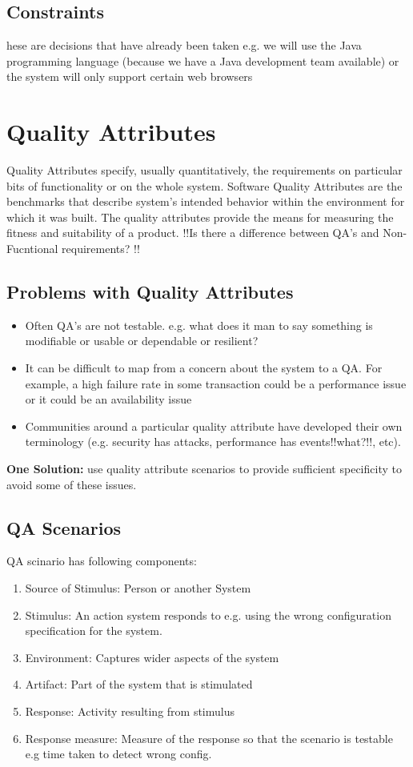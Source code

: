 \documentclass[a4paper]{report}
\begin{document}
\subsection{Constraints}
hese are decisions that have already been taken e.g. we will use the Java programming language (because we have a Java development team available) or the system will only support certain web browsers
\section{Quality Attributes}
Quality Attributes specify, usually quantitatively, the requirements on particular bits of functionality or on the whole system. 
Software Quality Attributes are the benchmarks that describe system’s intended behavior within the environment for which it was built. The quality attributes provide the means for measuring the fitness and suitability of a product.
!!Is there a difference between QA's and Non-Fucntional requirements? !!

\subsection{Problems with Quality Attributes}
\begin{itemize}
\item Often QA's are not testable. e.g. what does it man to say something is modifiable or usable or dependable or resilient?
\item It can be difficult to map from a concern about the system to a QA. For example, a high failure rate in some transaction could be a performance issue or it could be an availability issue
\item Communities around a particular quality attribute have developed their own terminology (e.g. security has attacks, performance has events!!what?!!, etc).
\end{itemize}

\textbf{One Solution: } use quality attribute scenarios to provide sufficient specificity to avoid some of these issues.

\subsection{QA Scenarios}
QA scinario has following components:
\begin{enumerate}
\item Source of Stimulus: Person or another System
\item Stimulus: An action system responds to e.g. using the wrong configuration specification for the system.
\item Environment: Captures wider aspects of the system
\item Artifact: Part of the system that is stimulated
\item Response: Activity resulting from stimulus
\item Response measure: Measure of the response so that the scenario is testable e.g time taken to detect wrong config.
\end{enumerate}
\end{document}
